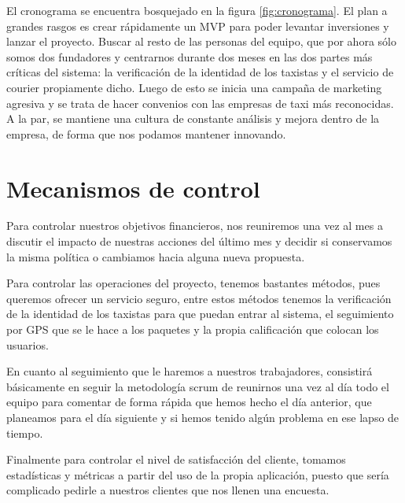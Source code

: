 El cronograma se encuentra bosquejado en la figura \ref{fig:cronograma}. El plan a grandes rasgos es crear rápidamente un MVP para poder levantar inversiones y lanzar el proyecto. Buscar al resto de las personas del equipo, que por ahora sólo somos dos fundadores y centrarnos durante dos meses en las dos partes más críticas del sistema: la verificación de la identidad de los taxistas y el servicio de courier propiamente dicho. Luego de esto se inicia una campaña de marketing agresiva y se trata de hacer convenios con las empresas de taxi más reconocidas. A la par, se mantiene una cultura de constante análisis y mejora dentro de la empresa, de forma que nos podamos mantener innovando.


\section{Mecanismos de control}

Para controlar nuestros objetivos financieros, nos reuniremos una vez al mes a discutir el impacto de nuestras acciones del último mes y decidir si conservamos la misma política o cambiamos hacia alguna nueva propuesta.

Para controlar las operaciones del proyecto, tenemos bastantes métodos, pues queremos ofrecer un servicio seguro, entre estos métodos tenemos la verificación de la identidad de los taxistas para que puedan entrar al sistema, el seguimiento por GPS que se le hace a los paquetes y la propia calificación que colocan los usuarios.

En cuanto al seguimiento que le haremos a nuestros trabajadores, consistirá básicamente en seguir la metodología scrum de reunirnos una vez al día todo el equipo para comentar de forma rápida que hemos hecho el día anterior, que planeamos para el día siguiente y si hemos tenido algún problema en ese lapso de tiempo.

Finalmente para controlar el nivel de satisfacción del cliente, tomamos estadísticas y métricas a partir del uso de la propia aplicación, puesto que sería complicado pedirle a nuestros clientes que nos llenen una encuesta.